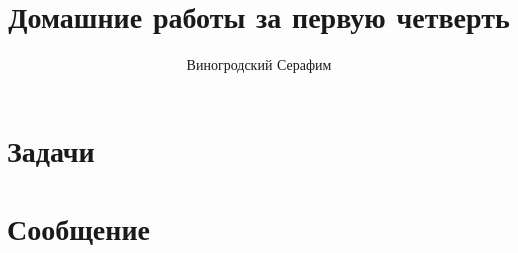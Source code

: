 \documentclass[12pt, a4paper]{article}
\title{Домашние работы за первую четверть}
\author{Виногродский Серафим}
\begin{document}
  \maketitle
  \setcounter{tocdepth}{2}
  \tableofcontents
  \pagebreak

  \part{Задачи}
  
  
  
  
  
  

  \pagebreak
  \part{Сообщение}
  
\end{document}

